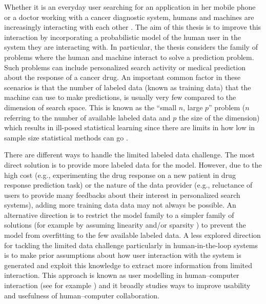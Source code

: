 \documentclass[dissertation,math,vertlayout,pdfa,colorlinks]{aaltoseries}
\begin{document}
Whether it is an everyday user searching for an application in her mobile phone or a doctor working with a cancer diagnostic system, humans and machines are increasingly interacting with each other \cite{amershi2014power}. The aim of this thesis is to improve this interaction by incorporating a probabilistic model of the human user in the system they are interacting with. In particular, the thesis considers the family of problems where the human and machine interact to solve a prediction problem. Such problems can include personalized search activity or medical prediction about the response of a cancer drug. An important common factor in these scenarios is that the number of labeled data (known as training data) that the machine can use to make predictions, is usually very few compared to the dimension of search space. This is known as the ``small $n$, large $p$'' problem ($n$ referring to the number of available labeled data and $p$ the size of the dimension) which results in ill-posed statistical learning since there are limits in how low in sample size statistical methods can go \cite{Donoho2009observed}. 

There are different ways to handle the limited labeled data challenge. The most direct solution is to provide more labeled data for the model. However, due to the high cost (e.g., experimenting the drug response on a new patient in drug response prediction task) or the nature of the data provider (e.g., reluctance of users to provide many feedbacks about their interest in personalized search systems), adding more training data data may not always be possible. An alternative direction is to restrict the model family to a simpler family of solutions (for example by assuming linearity and/or sparsity \cite{lasso2011}) to prevent the model from overfitting to the few available labeled data. A less explored direction for tackling the limited data challenge particularly in human-in-the-loop systems is to make prior assumptions about how user interaction with the system is generated and exploit this knowledge to extract more information from limited interaction. This approach is known as user modelling in human--computer interaction (see for example \cite{user_modelling_2001}) and it broadly studies ways to improve usability and usefulness of human--computer collaboration.

\end{document}
